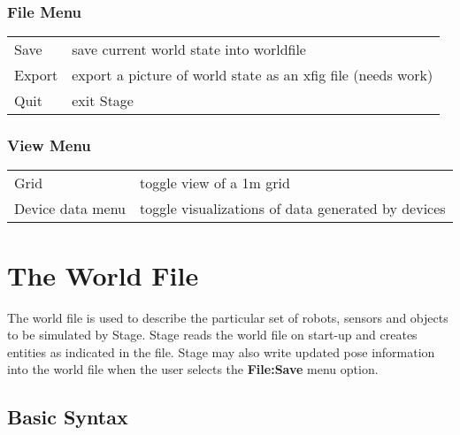 \documentclass[11pt]{report}
\begin{document}
\subsection{File Menu}

\begin{tabular}{|l|l|}
\hline 
Save & save current world state into worldfile\\
Export & export a picture of world state as an xfig file (needs work)\\
Quit & exit Stage\\
\hline
\end{tabular}

\subsection{View Menu}

\begin{tabular}{|l|l|}
\hline 
Grid & toggle view of a 1m grid\\
Device data menu & toggle visualizations of data generated by devices\\
\hline
\end{tabular}


\chapter{The World File}

The world file is used to describe the particular set of robots,
sensors and objects to be simulated by Stage.  Stage reads the world
file on start-up and creates entities as indicated in the file.  Stage
may also write updated pose information into the world file when the
user selects the {\bf File:Save} menu option.

\section{Basic Syntax}
\end{document}
